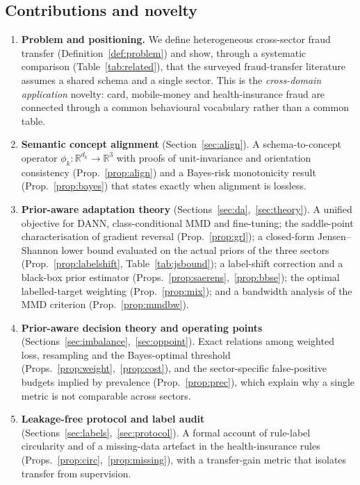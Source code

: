 \documentclass[journal]{IEEEtran}
\newcommand{\R}{\mathbb{R}}
\newcommand{\1}{\mathbf{1}}
\begin{document}
\subsection*{Contributions and novelty}
\begin{enumerate}
\item \textbf{Problem and positioning.} We define heterogeneous cross-sector fraud transfer (Definition~\ref{def:problem}) and show, through a systematic comparison (Table~\ref{tab:related}), that the surveyed fraud-transfer literature assumes a shared schema and a single sector. This is the \emph{cross-domain application} novelty: card, mobile-money and health-insurance fraud are connected through a common behavioural vocabulary rather than a common table.
\item \textbf{Semantic concept alignment} (Section~\ref{sec:align}). A schema-to-concept operator $\phi_k:\R^{d_k}\to\R^3$ with proofs of unit-invariance and orientation consistency (Prop.~\ref{prop:align}) and a Bayes-risk monotonicity result (Prop.~\ref{prop:bayes}) that states exactly when alignment is lossless.
\item \textbf{Prior-aware adaptation theory} (Sections~\ref{sec:da},~\ref{sec:theory}). A unified objective for DANN, class-conditional MMD and fine-tuning; the saddle-point characterisation of gradient reversal (Prop.~\ref{prop:grl}); a closed-form Jensen--Shannon lower bound evaluated on the actual priors of the three sectors (Prop.~\ref{prop:labelshift}, Table~\ref{tab:jsbound}); a label-shift correction and a black-box prior estimator (Props.~\ref{prop:saerens},~\ref{prop:bbse}); the optimal labelled-target weighting (Prop.~\ref{prop:mix}); and a bandwidth analysis of the MMD criterion (Prop.~\ref{prop:mmdbw}).
\item \textbf{Prior-aware decision theory and operating points} (Sections~\ref{sec:imbalance},~\ref{sec:oppoint}). Exact relations among weighted loss, resampling and the Bayes-optimal threshold (Props.~\ref{prop:weight},~\ref{prop:cost}), and the sector-specific false-positive budgets implied by prevalence (Prop.~\ref{prop:prec}), which explain why a single metric is not comparable across sectors.
\item \textbf{Leakage-free protocol and label audit} (Sections~\ref{sec:labels},~\ref{sec:protocol}). A formal account of rule-label circularity and of a missing-data artefact in the health-insurance rules (Props.~\ref{prop:circ},~\ref{prop:missing}), with a transfer-gain metric that isolates transfer from supervision.
\end{enumerate}
\end{document}
